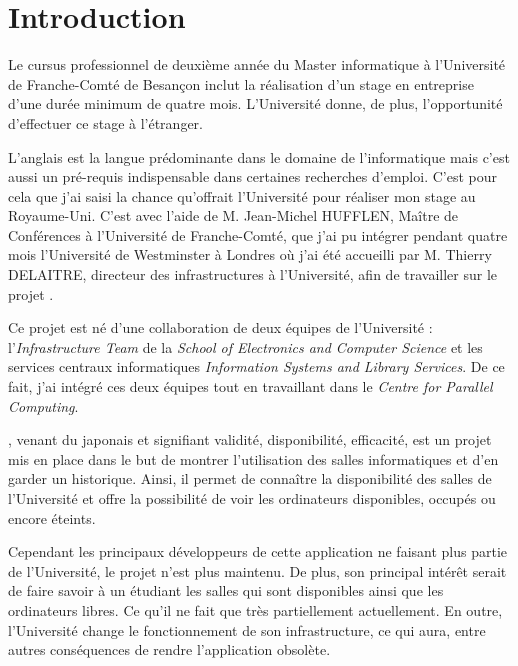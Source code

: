 \chapter*{Introduction}

Le cursus professionnel de deuxi\`eme ann\'ee du Master informatique \`a l'Universit\'e de Franche-Comt\'e de Besan\c{c}on inclut la r\'ealisation d'un stage en entreprise d'une dur\'ee minimum de quatre mois. 
L'Universit\'e donne, de plus, l'opportunit\'e d'effectuer ce stage \`a l'\'etranger.

L'anglais est la langue pr\'edominante dans le domaine de l'informatique mais c'est aussi un pr\'e-requis indispensable dans certaines recherches d'emploi.
C'est pour cela que j'ai saisi la chance qu'offrait l'Universit\'e pour r\'ealiser mon stage au Royaume-Uni. 
C'est avec l'aide de M. Jean-Michel HUFFLEN, Ma\^itre de Conf\'erences \`a l'Universit\'e de Franche-Comt\'e, que j'ai pu int\'egrer pendant quatre mois l'Universit\'e de Westminster \`a Londres o\`u j'ai \'et\'e accueilli par M. Thierry DELAITRE, directeur des infrastructures \`a l'Universit\'e, afin de travailler sur le projet \YuukouII.

Ce projet est n\'e d'une collaboration de deux \'equipes de l'Universit\'e : l'\textit{Infrastructure Team} de la \textit{School of Electronics and Computer Science} et les services centraux informatiques \textit{Information Systems and Library Services}. 
De ce fait, j'ai int\'egr\'e ces deux \'equipes tout en travaillant dans le \textit{Centre for Parallel Computing}.

\Yuukou, venant du japonais et signifiant validit\'e, disponibilit\'e, efficacit\'e, est un projet mis en place dans le but de montrer l'utilisation des salles informatiques et d'en garder un historique.
Ainsi, il permet de conna\^itre la disponibilit\'e des salles de l'Universit\'e et offre la possibilit\'e de voir les ordinateurs disponibles, occup\'es ou encore \'eteints.

Cependant les principaux d\'eveloppeurs de cette application ne faisant plus partie de l'Universit\'e, le projet n'est plus maintenu.
De plus, son principal int\'er\^et serait de faire savoir \`a un \'etudiant les salles qui sont disponibles ainsi que les ordinateurs libres.
Ce qu'il ne fait que tr\`es partiellement actuellement.
En outre, l'Universit\'e change le fonctionnement de son infrastructure, ce qui aura, entre autres cons\'equences de rendre l'application obsol\`ete.

